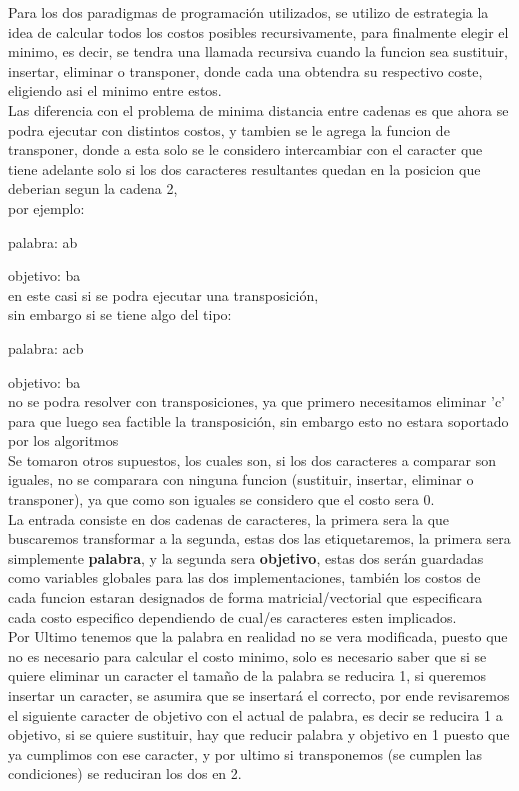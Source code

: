 Para los dos paradigmas de programación utilizados, se utilizo de estrategia la idea de calcular todos los costos posibles recursivamente, para finalmente elegir el minimo, es decir, se tendra una llamada recursiva cuando la funcion sea sustituir, insertar, eliminar o transponer, donde cada una obtendra su respectivo coste, eligiendo asi el minimo entre estos.\\
Las diferencia con el problema de minima distancia entre cadenas es que ahora se podra ejecutar con distintos costos, y tambien se le agrega la funcion de transponer, donde a esta solo se le considero intercambiar con el caracter que tiene adelante solo si los dos caracteres resultantes quedan en la posicion que deberian segun la cadena 2, \\por ejemplo:

palabra: ab

objetivo: ba\\ 
en este casi si se podra ejecutar una transposición, \\sin embargo si se tiene algo del tipo:

palabra: acb

objetivo: ba\\ 
no se podra resolver con transposiciones, ya que primero necesitamos eliminar 'c' para que luego sea factible la transposición, sin embargo esto no estara soportado por los algoritmos\\
Se tomaron otros supuestos, los cuales son, si los dos caracteres a comparar son iguales, no se comparara con ninguna funcion (sustituir, insertar, eliminar o transponer), ya que como son iguales se considero que el costo sera 0.
\\ 
La entrada consiste en dos cadenas de caracteres, la primera sera la que buscaremos transformar a la segunda, estas dos las etiquetaremos, la primera sera simplemente \textbf{palabra}, y la segunda sera \textbf{objetivo}, estas dos serán guardadas como variables globales para las dos implementaciones, también los costos de cada funcion estaran designados de forma matricial/vectorial que especificara cada costo especifico dependiendo de cual/es caracteres esten implicados.
\\
Por Ultimo tenemos que la palabra en realidad no se vera modificada, puesto que no es necesario para calcular el costo minimo, solo es necesario saber que si se quiere eliminar un caracter el tamaño de la palabra se reducira 1, si queremos insertar un caracter, se asumira que se insertará el correcto, por ende revisaremos el siguiente caracter de objetivo con el actual de palabra, es decir se reducira 1 a objetivo, si se quiere sustituir, hay que reducir palabra y objetivo en 1 puesto que ya cumplimos con ese caracter, y por ultimo si transponemos (se cumplen las condiciones) se reduciran los dos en 2.


